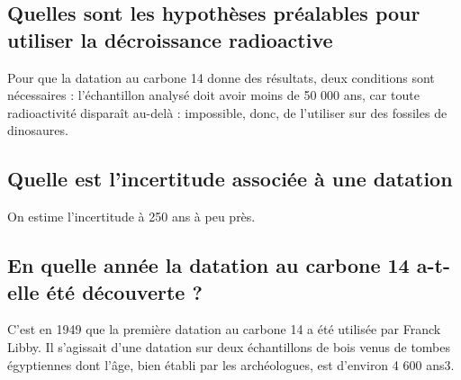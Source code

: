 \documentclass[a4paper,10pt,french]{scrartcl}
\begin{document}
\subsection{Quelles sont les hypothèses préalables pour utiliser la décroissance radioactive}
Pour que la datation au carbone 14 donne des résultats, deux conditions sont nécessaires : l'échantillon analysé doit avoir moins de 50 000 ans, car toute radioactivité disparaît au-delà : impossible, donc, de l'utiliser sur des fossiles de dinosaures.
\subsection{Quelle est l'incertitude associée à une datation}
On estime l'incertitude à 250 ans à peu près.
\subsection{En quelle année la datation au carbone 14 a-t-elle été découverte ?}
C'est en 1949 que la première datation au carbone 14 a été utilisée par Franck Libby. Il s'agissait d'une datation sur deux échantillons de bois venus de tombes égyptiennes dont l'âge, bien établi par les archéologues, est d'environ 4 600 ans3.
\end{document}
